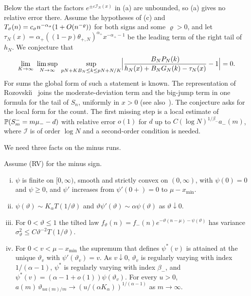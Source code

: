 \begin{remark}[a conjecture]\label{rem:window-conj}
Below the start the factors $e^{\pm\varepsilon\mathcal I_N(x)}$ in (a) are unbounded, so (a)
gives no relative error there. Assume the hypotheses of (c) and
$T_\sigma(n)=c_\sigma n^{-\alpha_\sigma}(1+O(n^{-\varrho}))$ for both signs and some $\varrho>0$,
and let $\tau_N(x)=\alpha_\plus((1-p)\theta_{\plus,N})^{\alpha_\plus}x^{-\alpha_\plus-1}$ be
the leading term of the right tail of $h_N$. We conjecture that
\[
 \lim_{K\to\infty}\ \limsup_{N\to\infty}\ \sup_{pN+KB_N\le k\le pN+N/K}
 \Bigl|\frac{B_NP_N(k)}{h_N(x)+B_NG_N(k)-\tau_N(x)}-1\Bigr|=0 .
\]
For sums the global form of such a statement is known. The representation of
Rozovski\u{\i}~\cite{rozovskii1997} joins the moderate-deviation term and the big-jump term
in one formula for the tail of $S_n$, uniformly in $x>0$ (see also~\cite{rozovskii1993}). The
conjecture asks for the local form for the count. The first missing step is a local
estimate of $\mathbb{P}(S^{-}_m=m\mu_{-}-d)$ with
relative error $o(1)$ for $d$ up to $C(\log N)^{1/\beta_\minus}a_\minus(m)$, where
$\mathcal I$ is of order $\log N$ and a second-order condition is needed.
\end{remark}

We need three facts on the minus runs.

\ifarxivbuild
\begin{lemma}\label{lem:laplace}
Assume (RV) for the minus sign.
\begin{enumerate}[(i)]
\item $\psi$ is finite on $[0,\infty)$, smooth and strictly convex on $(0,\infty)$, with
$\psi(0)=0$ and $\psi\ge0$, and $\psi'$ increases from $\psi'(0+)=0$ to $\mu-x_{\min}$.
\item $\psi(\vartheta)\sim K_\alpha T(1/\vartheta)$ and
$\vartheta\psi'(\vartheta)\sim\alpha\psi(\vartheta)$ as $\vartheta\downarrow0$.
\item For $0<\vartheta\le1$ the tilted law
$f_\vartheta(n)=f_\minus(n)e^{-\vartheta(n-\mu)-\psi(\vartheta)}$ has variance
$\sigma^2_\vartheta\le C\vartheta^{-2}T(1/\vartheta)$.
\item For $0<v<\mu-x_{\min}$ the supremum that defines $\psi^*(v)$ is attained at the
unique $\vartheta_v$ with $\psi'(\vartheta_v)=v$. As $v\downarrow0$, $\vartheta_v$ is
regularly varying with index $1/(\alpha-1)$, $\psi^*$ is regularly varying with index
$\beta_\minus$, and $\psi^*(v)=(\alpha-1+o(1))\psi(\vartheta_v)$. For every $u>0$,
$a(m)\,\vartheta_{ua(m)/m}\to(u/(\alpha K_\alpha))^{1/(\alpha-1)}$ as $m\to\infty$.
\end{enumerate}
\end{lemma}

